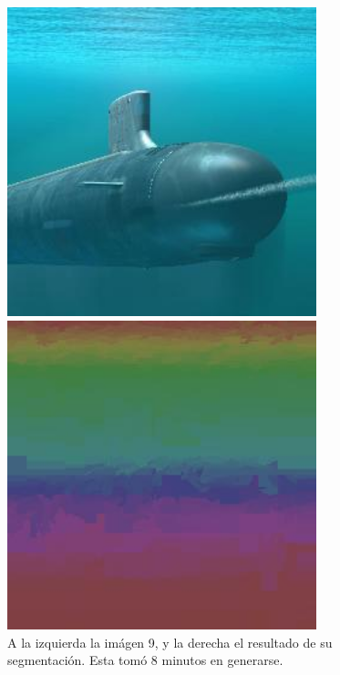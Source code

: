 \documentclass[letterpaper,11pt]{article} %
\begin{document}
      \begin{figure}[H]
        \centering
        \begin{minipage}{0.4\textwidth}
          \includegraphics[width=0.8\textwidth]{images/image_9}
        \end{minipage}
        \begin{minipage}{0.4\textwidth}
          \includegraphics[width=0.8\textwidth]{images/result_image9}
        \end{minipage}
        \caption{A la izquierda la imágen 9, y la derecha el resultado de su segmentación. Esta tomó 8 minutos en generarse.}
      \end{figure}
\end{document}

